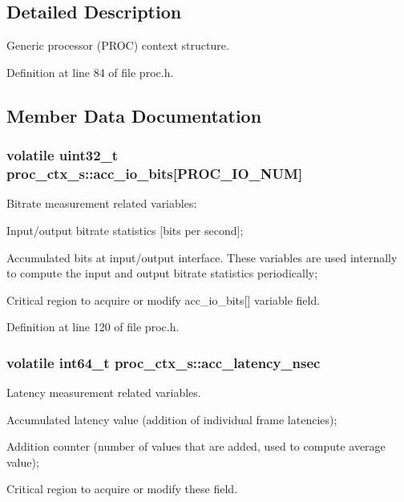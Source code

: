 \subsection{Detailed Description}
Generic processor (P\+R\+OC) context structure. 

Definition at line 84 of file proc.\+h.



\subsection{Member Data Documentation}
\subsubsection[{\texorpdfstring{acc\+\_\+io\+\_\+bits}{acc_io_bits}}]{\setlength{\rightskip}{0pt plus 5cm}volatile uint32\+\_\+t proc\+\_\+ctx\+\_\+s\+::acc\+\_\+io\+\_\+bits\mbox{[}P\+R\+O\+C\+\_\+\+I\+O\+\_\+\+N\+UM\mbox{]}}\hypertarget{structproc__ctx__s_a63e59dc7c4a361ca2b52e2354f51c33a}{}\label{structproc__ctx__s_a63e59dc7c4a361ca2b52e2354f51c33a}
Bitrate measurement related variables\+:
\begin{DoxyItemize}
\item Input/output bitrate statistics \mbox{[}bits per second\mbox{]};
\item Accumulated bits at input/output interface. These variables are used internally to compute the input and output bitrate statistics periodically;
\item Critical region to acquire or modify \textquotesingle{}acc\+\_\+io\+\_\+bits\mbox{[}\mbox{]}\textquotesingle{} variable field. 
\end{DoxyItemize}

Definition at line 120 of file proc.\+h.

\subsubsection[{\texorpdfstring{acc\+\_\+latency\+\_\+nsec}{acc_latency_nsec}}]{\setlength{\rightskip}{0pt plus 5cm}volatile int64\+\_\+t proc\+\_\+ctx\+\_\+s\+::acc\+\_\+latency\+\_\+nsec}\hypertarget{structproc__ctx__s_a58e7e20b896b1d74789f2fe9b971fd09}{}\label{structproc__ctx__s_a58e7e20b896b1d74789f2fe9b971fd09}
Latency measurement related variables.
\begin{DoxyItemize}
\item Accumulated latency value (addition of individual frame latencies);
\item Addition counter (number of values that are added, used to compute average value);
\item Critical region to acquire or modify these field. 
\end{DoxyItemize}

